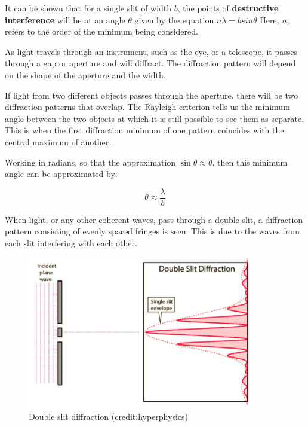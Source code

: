 \documentclass[revision-guide.tex]{subfiles}
\begin{document}
It can be shown that for a single slit of width $b$, the points of \textbf{destructive interference} will be at an angle $\theta$ given by the equation
$n\lambda = b sin\theta$
Here, $n$, refers to the order of the minimum being considered.


As light travels through an instrument, such as the eye, or a telescope, it passes through a gap or aperture and will diffract. The diffraction pattern will depend on the shape of the aperture and the width.

If light from two different objects passes through the aperture, there will be two diffraction patterns that overlap. The Rayleigh criterion tells us the minimum angle between the two objects at which it is still possible to see them as separate. This is when the first diffraction minimum of one pattern coincides with the central maximum of another.

Working in radians, so that the approximation $\sin{\theta} \approx \theta$, then this minimum angle can be approximated by:

$$\theta \approx \frac{\lambda}{b}$$



When light, or any other coherent waves, pass through a double slit, a diffraction pattern consisting of evenly spaced fringes is seen. This is due to the waves from each slit interfering with each other.

\begin{figure}[h!]
\centering
\includegraphics[width=10cm]{figs/chapt-7/double.JPG}
\caption{Double slit diffraction (credit:hyperphysics)}
\end{figure}
\end{document}

